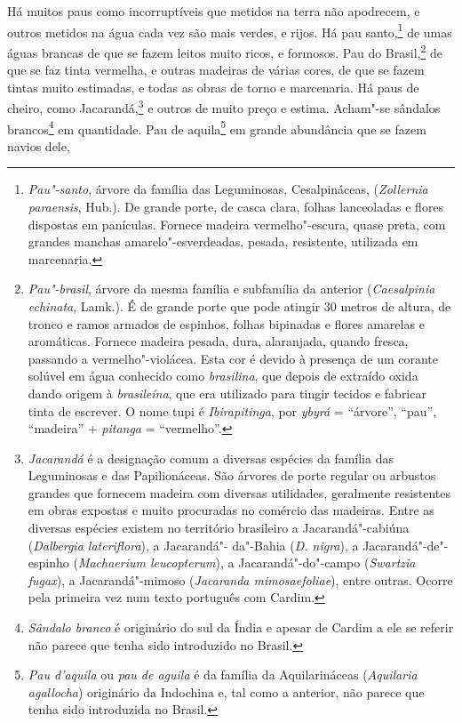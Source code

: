  Há muitos paus como incorruptíveis que metidos na terra não apodrecem,
e outros metidos na água cada vez são mais verdes, e rijos. Há pau
santo,\footnote{ \textit{Pau"-santo}, árvore da família das
Leguminosas, Cesalpináceas, (\textit{Zollernia paraensis}, Hub.). De
grande porte, de casca clara, folhas lanceoladas e flores dispostas em
panículas. Fornece madeira vermelho"-escura, quase preta, com grandes
manchas amarelo"-esverdeadas, pesada, resistente, utilizada em
marcenaria.} de umas águas brancas de que se fazem leitos muito ricos,
e formosos. Pau do Brasil,\footnote{ \textit{Pau"-brasil}, árvore da
mesma família e subfamília da anterior (\textit{Caesalpinia echinata}, 
Lamk.). É de grande porte que pode atingir 30 metros de altura, de
tronco e ramos armados de espinhos, folhas bipinadas e flores amarelas
e aromáticas. Fornece madeira pesada, dura, alaranjada, quando fresca,
passando a vermelho"-violácea. Esta cor é devido à presença de um
corante solúvel em água conhecido como \textit{brasilina}, que depois
de extraído oxida dando origem à \textit{brasileína}, que era utilizado
para tingir tecidos e fabricar tinta de escrever. O nome tupi é
\textit{Ibirapitinga}, por \textit{ybyrá} = ``árvore'', ``pau'', ``madeira''
+ \textit{pitanga} = ``vermelho''.} de que se faz tinta vermelha, e
outras madeiras de várias cores, de que se fazem tintas muito
estimadas, e todas as obras de torno e marcenaria. Há paus de cheiro,
como Jacarandá,\footnote{ \textit{Jacarandá} é a designação comum a
diversas espécies da família das Leguminosas e das Papilionáceas. São
árvores de porte regular ou arbustos grandes que fornecem madeira com
diversas utilidades, geralmente resistentes em obras expostas e muito
procuradas no comércio das madeiras. Entre as diversas espécies existem
no território brasileiro a Jacarandá"-cabiúna (\textit{Dalbergia
lateriflora}), a Jacarandá"- da"-Bahia (\textit{D. nigra}), a
Jacarandá"-de"-espinho (\textit{Machaerium leucopterum}), a
Jacarandá"-do"-campo (\textit{Swartzia fugax}), a Jacarandá"-mimoso
(\textit{Jacaranda mimosaefoliae}), entre outras. Ocorre pela primeira
vez num texto português com Cardim.} e outros de muito preço e estima.
Acham"-se sândalos brancos\footnote{ \textit{Sândalo branco} é
originário do sul da Índia e apesar de Cardim a ele se referir não
parece que tenha sido introduzido no Brasil.} em quantidade. Pau de
aquila\footnote{ \textit{Pau d'aquila} ou \textit{pau de aguila} é
da família da Aquilarináceas (\textit{Aquilaria agallocha}) originário
da Indochina e, tal como a anterior, não parece que tenha sido
introduzida no Brasil.} em grande abundância que se fazem navios dele,
